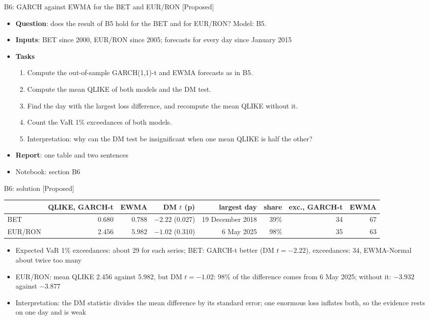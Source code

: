 \begin{frame}{B6: GARCH against EWMA for the BET and EUR/RON [Proposed]}
\itemsize{\footnotesize}
\begin{itemize}
\item \textbf{Question}: does the result of B5 hold for the BET and for EUR/RON? Model: B5.
\item \textbf{Inputs}: BET since 2000, EUR/RON since 2005; forecasts for every day since January 2015
\item \textbf{Tasks}
\begin{enumerate}
    \item Compute the out-of-sample GARCH(1,1)-t and EWMA forecasts as in B5.
    \item Compute the mean QLIKE of both models and the DM test.
    \item Find the day with the largest loss difference, and recompute the mean QLIKE without it.
    \item Count the VaR 1\% exceedances of both models.
    \item Interpretation: why can the DM test be insignificant when one mean QLIKE is half the other?
\end{enumerate}
\item \textbf{Report}: one table and two sentences
\item Notebook: section B6
\end{itemize}
\end{frame}

\ifsolutions
\begin{frame}{B6: solution [Proposed]}
\itemsize{\footnotesize}
\begin{center}
\scriptsize
\begin{tabular}{lrrrrrrr}
\toprule
& QLIKE, GARCH-t & EWMA & DM $t$ (p) & largest day & share & exc., GARCH-t & EWMA \\
\midrule
BET & $0.680$ & $0.788$ & ${-2.22}$ (0.027) & 19 December 2018 & 39\% & 34 & 67 \\
EUR/RON & $2.456$ & $5.982$ & ${-1.02}$ (0.310) & 6 May 2025 & 98\% & 35 & 63 \\
\bottomrule
\end{tabular}
\end{center}
\begin{itemize}
    \item Expected VaR 1\% exceedances: about 29 for each series; BET: GARCH-t better (DM $t = -2.22$), exceedances: 34, EWMA-Normal about twice too many
    \item EUR/RON: mean QLIKE 2.456 against 5.982, but DM $t = -1.02$: 98\% of the difference comes from 6 May 2025; without it: $-3.932$ against $-3.877$
    \item Interpretation: the DM statistic divides the mean difference by its standard error; one enormous loss inflates both, so the evidence rests on one day and is weak
\end{itemize}
\end{frame}
\fi


